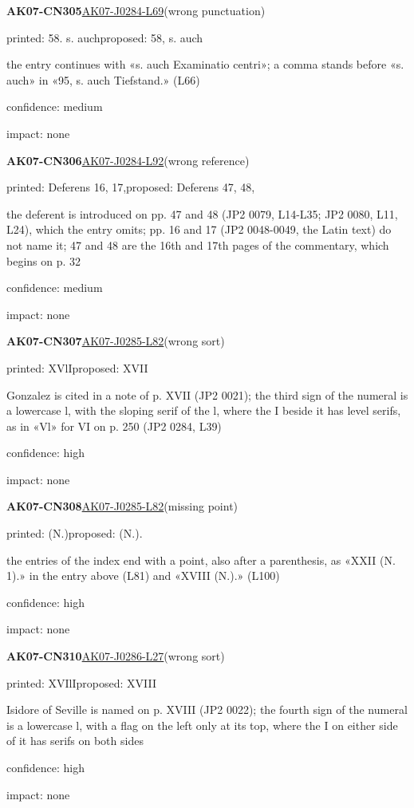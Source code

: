 \documentclass[11pt]{article}
\begin{document}
\noindent\textbf{AK07-CN305}\enspace\hyperlink{AK07-J0284-L69}{AK07-J0284-L69}\enspace(wrong punctuation)\par\noindent printed: 58. s. auch\enspace proposed: 58, s. auch\par\noindent the entry continues with «s. auch Examinatio centri»; a comma stands before «s. auch» in «95, s. auch Tiefstand.» (L66)\par\noindent confidence: medium\par\noindent impact: none\par\medskip
\noindent\textbf{AK07-CN306}\enspace\hyperlink{AK07-J0284-L92}{AK07-J0284-L92}\enspace(wrong reference)\par\noindent printed: Deferens 16, 17,\enspace proposed: Deferens 47, 48,\par\noindent the deferent is introduced on pp. 47 and 48 (JP2 0079, L14-L35; JP2 0080, L11, L24), which the entry omits; pp. 16 and 17 (JP2 0048-0049, the Latin text) do not name it; 47 and 48 are the 16th and 17th pages of the commentary, which begins on p. 32\par\noindent confidence: medium\par\noindent impact: none\par\medskip
\noindent\textbf{AK07-CN307}\enspace\hyperlink{AK07-J0285-L82}{AK07-J0285-L82}\enspace(wrong sort)\par\noindent printed: XVlI\enspace proposed: XVII\par\noindent Gonzalez is cited in a note of p. XVII (JP2 0021); the third sign of the numeral is a lowercase l, with the sloping serif of the l, where the I beside it has level serifs, as in «Vl» for VI on p. 250 (JP2 0284, L39)\par\noindent confidence: high\par\noindent impact: none\par\medskip
\noindent\textbf{AK07-CN308}\enspace\hyperlink{AK07-J0285-L82}{AK07-J0285-L82}\enspace(missing point)\par\noindent printed: (N.)\enspace proposed: (N.).\par\noindent the entries of the index end with a point, also after a parenthesis, as «XXII (N. 1).» in the entry above (L81) and «XVIII (N.).» (L100)\par\noindent confidence: high\par\noindent impact: none\par\medskip
\noindent\textbf{AK07-CN310}\enspace\hyperlink{AK07-J0286-L27}{AK07-J0286-L27}\enspace(wrong sort)\par\noindent printed: XVIlI\enspace proposed: XVIII\par\noindent Isidore of Seville is named on p. XVIII (JP2 0022); the fourth sign of the numeral is a lowercase l, with a flag on the left only at its top, where the I on either side of it has serifs on both sides\par\noindent confidence: high\par\noindent impact: none\par\medskip
\end{document}
